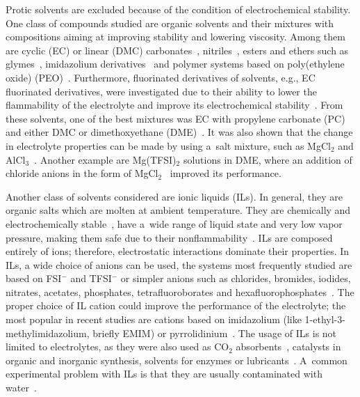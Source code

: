 Protic solvents are excluded because of the condition of electrochemical stability. One class of compounds studied are organic solvents and their mixtures with compositions aiming at improving stability and lowering viscosity. Among them are cyclic (EC) or linear (DMC) carbonates~\cite{el-carbonates}, nitriles~\cite{el-nitriles}, esters and ethers such as glymes~\cite{el-ethers-1,el-ethers-2,mg-ion-20}, imidazolium derivatives~\cite{el-imidazolium} and polymer systems based on poly(ethylene oxide) (PEO)~\cite{el-peo-1,el-peo-2,mg-ion-19}. Furthermore, fluorinated derivatives of solvents, e.g., EC fluorinated derivatives, were investigated due to their ability to lower the flammability of the electrolyte and improve its electrochemical stability~\cite{fluorination-1,fluorination-2,fluorination-3,fluorination-4}. From these solvents, one of the best mixtures was EC with propylene carbonate (PC) and either DMC or dimethoxyethane (DME)~\cite{na-ion-6,mg-ion-18}. It was also shown that the change in electrolyte properties can be made by using a~salt mixture, such as MgCl$_2$ and AlCl$_3$~\cite{mg-ion-6}. Another example are Mg(TFSI)$_2$ solutions in DME, where an addition of chloride anions in the form of MgCl$_2$~\cite{mg-cl-tfsi} improved its performance.

Another class of solvents considered are ionic liquids (ILs). In general, they are organic salts which are molten at ambient temperature. They are chemically and electrochemically stable~\cite{il-3}, have a~wide range of liquid state and very low vapor pressure, making them safe due to their nonflammability~\cite{il-stability}. ILs are composed entirely of ions; therefore, electrostatic interactions dominate their properties. In ILs, a wide choice of anions can be used, the systems most frequently studied are based on FSI$^{-}$ and TFSI$^{-}$ or simpler anions such as chlorides, bromides, iodides, nitrates, acetates, phosphates, tetrafluoroborates and hexafluorophosphates~\cite{il-1}. The proper choice of IL cation could improve the performance of the electrolyte; the most popular in recent studies are cations based on imidazolium (like 1-ethyl-3-methylimidazolium, briefly EMIM) or pyrrolidinium~\cite{na-il-1,na-il-2,na-il-3,na-il-4,na-il-5,na-il-6,na-il-7,na-il-8,na-il-9,na-il-10,na-il-11,mg-ion-13,mg-ion-14}. The usage of ILs is not limited to electrolytes, as they were also used as CO$_2$ absorbents~\cite{il-2}, catalysts in organic and inorganic synthesis, solvents for enzymes or lubricants~\cite{il-5}. A~common experimental problem with ILs is that they are usually contaminated with water~\cite{il-4}.

